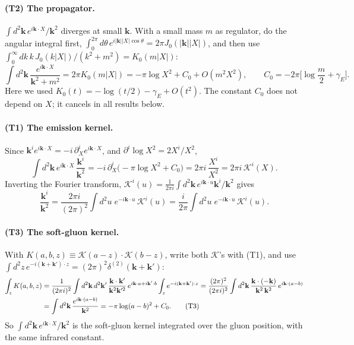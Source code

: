 \documentclass[10pt]{article}
\numberwithin{equation}{section}
\newcommand{\KK}{\mathcal K}
\newcommand{\bk}{\mathbf k}
\begin{document}
\paragraph{(T2) The propagator.} $\int d^2\bk\,e^{i\bk\cdot X}/\bk^2$ diverges at small $\bk$. With a small mass $m$ as regulator, do the angular integral first, $\int_0^{2\pi}d\theta\,e^{i|\bk||X|\cos\theta}=2\pi J_0(|\bk||X|)$, and then use $\int_0^\infty dk\,k\,J_0(k|X|)/(k^2+m^2)=K_0(m|X|)$:
\begin{equation}
\int d^2\bk\,\frac{e^{i\bk\cdot X}}{\bk^2+m^2}=2\pi K_0(m|X|)=-\pi\log X^2+C_0+O(m^2X^2),\qquad C_0=-2\pi\Big[\log\frac m2+\gamma_E\Big].
\tag{T2}
\end{equation}
Here we used $K_0(t)=-\log(t/2)-\gamma_E+O(t^2)$. The constant $C_0$ does not depend on $X$; it cancels in all results below.
\paragraph{(T1) The emission kernel.} Since $\bk^ie^{i\bk\cdot X}=-i\,\partial^i_Xe^{i\bk\cdot X}$, and $\partial^i\log X^2=2X^i/X^2$,
\begin{equation}
\int d^2\bk\,e^{i\bk\cdot X}\,\frac{\bk^i}{\bk^2}=-i\,\partial^i_X\big(-\pi\log X^2+C_0\big)=2\pi i\,\frac{X^i}{X^2}=2\pi i\,\KK^i(X).
\tag{T1}
\end{equation}
Inverting the Fourier transform, $\KK^i(u)=\frac{1}{2\pi i}\int d^2\bk\,e^{i\bk\cdot u}\bk^i/\bk^2$ gives
\begin{equation}
\frac{\bk^i}{\bk^2}=\frac{2\pi i}{(2\pi)^2}\int d^2u\;e^{-i\bk\cdot u}\,\KK^i(u)=\frac{i}{2\pi}\int d^2u\;e^{-i\bk\cdot u}\,\KK^i(u).
\tag{T1$'$}
\end{equation}
\paragraph{(T3) The soft-gluon kernel.} With $K(a,b,z)\equiv\KK(a-z)\cdot\KK(b-z)$, write both $\KK$'s with (T1), and use $\int d^2z\,e^{-i(\bk+\bk')\cdot z}=(2\pi)^2\delta^{(2)}(\bk+\bk')$:
\begin{align}
\int_zK(a,b,z)&=\frac{1}{(2\pi i)^2}\int d^2\bk\,d^2\bk'\,\frac{\bk\cdot\bk'}{\bk^2\bk'^2}\,e^{i\bk\cdot a+i\bk'\cdot b}\int_ze^{-i(\bk+\bk')\cdot z}
=\frac{(2\pi)^2}{(2\pi i)^2}\int d^2\bk\,\frac{\bk\cdot(-\bk)}{\bk^2\,\bk^2}\,e^{i\bk\cdot(a-b)}\notag\\
&=\int d^2\bk\,\frac{e^{i\bk\cdot(a-b)}}{\bk^2}=-\pi\log(a-b)^2+C_0 .
\tag{T3}
\end{align}
So $\int d^2\bk\,e^{i\bk\cdot X}/\bk^2$ is the soft-gluon kernel integrated over the gluon position, with the same infrared constant.
\end{document}
